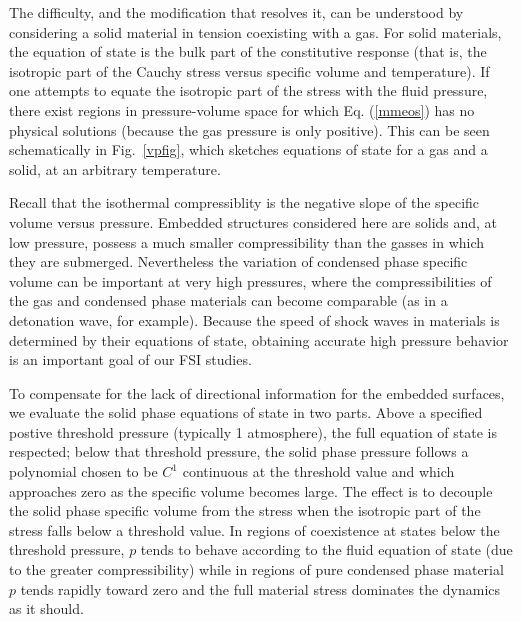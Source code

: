 The difficulty, and the modification that resolves it, can be understood by considering a solid material in tension coexisting with a gas.  For solid materials, the equation of state is the bulk part of the constitutive response (that is, the isotropic part of the Cauchy stress versus specific volume and temperature).  If one attempts to equate the isotropic part of the stress with the fluid pressure, there exist regions in pressure-volume space for which Eq. (\ref{mmeos}) has no physical solutions (because the gas pressure is only positive).  This can be seen schematically in Fig.~\ref{vpfig}, which sketches equations of state for a gas and a solid, at an arbitrary temperature.

Recall that the isothermal compressiblity is the negative slope of the specific volume versus pressure.  Embedded structures considered here are solids and, at low pressure, possess a much smaller compressibility than the gasses in which they are submerged.  Nevertheless the variation of condensed phase specific volume can be important at very high pressures, where the compressibilities of the gas and condensed phase materials can become comparable (as in a detonation wave, for example).  Because the speed of shock waves in materials is determined by their equations of state, obtaining accurate high pressure behavior is an important goal of our FSI studies.

To compensate for the lack of directional information for the embedded surfaces, we evaluate the solid phase equations of state in two parts. Above a specified postive threshold pressure (typically 1 atmosphere), the full equation of state is respected; below that threshold pressure, the solid phase pressure follows a polynomial chosen to be $C^1$ continuous at the threshold value and which approaches zero as the specific volume becomes large.  The effect is to decouple the solid phase specific volume from the stress when the isotropic part of the stress falls below a threshold value.  In regions of coexistence at states below the threshold pressure, $p$ tends to behave according to the fluid equation of state (due to the greater compressibility) while in regions of pure condensed phase material $p$ tends rapidly toward zero and the full material stress dominates the dynamics as it should.


